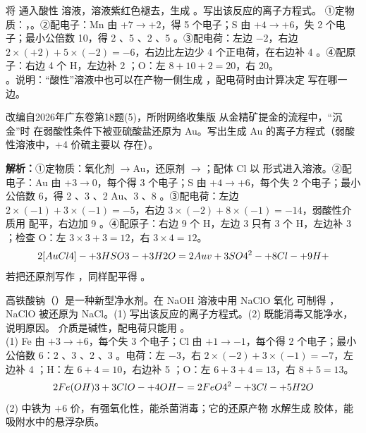 \begin{liti}[基础\quad 原创]
将  通入酸性  溶液，溶液紫红色褪去，生成 。写出该反应的离子方程式。
\tcblower
\jie ①定物质：，。②配电子：Mn 由 $+7\to+2$，得 5 个电子；S 由 $+4\to+6$，失 2 个电子；最小公倍数 10，得 2 、5 、2 、5 。③配电荷：左边 $-2$，右边 $2\times(+2)+5\times(-2)=-6$，右边比左边少 4 个正电荷，在右边补 4 。④配原子：右边 4 个 H，左边补 2 ；O：左 $8+10+2=20$，右 20。\\
\daan {}。说明：“酸性”溶液中也可以在产物一侧生成 ，配电荷时由计算决定  写在哪一边。
\end{liti}

\begin{zhenti}{改编自2026年广东卷第18题(5)，所附网络收集版}
从金精矿提金的流程中，“沉金”时 \ce{[AuCl4]-} 在弱酸性条件下被亚硫酸盐还原为 Au。写出生成 Au 的离子方程式（弱酸性溶液中，+4 价硫主要以  存在）。

\textbf{解析：}①定物质：氧化剂 \ce{[AuCl4]-}$\to$Au，还原剂 $\to$；配体 Cl 以  形式进入溶液。②配电子：Au 由 $+3\to0$，每个得 3 个电子；S 由 $+4\to+6$，每个失 2 个电子；最小公倍数 6，得 2 \ce{[AuCl4]-}、3 、2 Au、3 、8 。③配电荷：左边 $2\times(-1)+3\times(-1)=-5$，右边 $3\times(-2)+8\times(-1)=-14$，弱酸性介质用  配平，右边加 9 。④配原子：右边 9 个 H，左边 3  只有 3 个 H，左边补 3 ；检查 O：左 $3\times3+3=12$，右 $3\times4=12$。
\[2[AuCl4]- + 3HSO3- + 3H2O = 2Au v + 3SO4^2- + 8Cl- + 9H+\]
若把还原剂写作 ，同样配平得 。
\end{zhenti}

\begin{liti}[综合\quad 原创]
高铁酸钠（）是一种新型净水剂。在 NaOH 溶液中用 NaClO 氧化  可制得 ，NaClO 被还原为 NaCl。(1) 写出该反应的离子方程式。(2)  既能消毒又能净水，说明原因。
\tcblower
\silu 介质是碱性，配电荷只能用 。\\
\jie (1) Fe 由 $+3\to+6$，每个失 3 个电子；Cl 由 $+1\to-1$，每个得 2 个电子；最小公倍数 6：2 、3 、2 、3 。电荷：左 $-3$，右 $2\times(-2)+3\times(-1)=-7$，左边补 4 ；H：左 $6+4=10$，右边补 5 ；O：左 $6+3+4=13$，右 $8+5=13$。
\[2Fe(OH)3 + 3ClO- + 4OH- = 2FeO4^2- + 3Cl- + 5H2O\]
(2)  中铁为 $+6$ 价，有强氧化性，能杀菌消毒；它的还原产物  水解生成  胶体，能吸附水中的悬浮杂质。
\end{liti}

